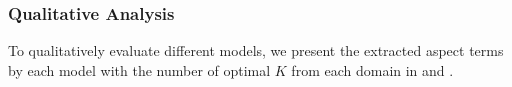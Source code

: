


\subsubsection{Qualitative Analysis}

To qualitatively evaluate different models,
we present the extracted aspect terms
by each model with the number of optimal $K$
 from each domain in  and
 . 
 
